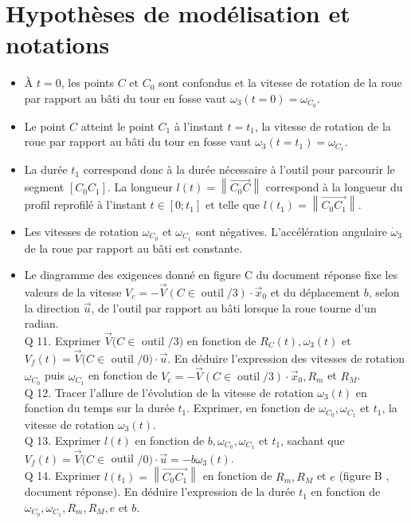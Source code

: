 \documentclass[10pt]{article}
\begin{document}
\section*{Hypothèses de modélisation et notations}
\begin{itemize}
  \item À $t=0$, les points $C$ et $C_{0}$ sont confondus et la vitesse de rotation de la roue par rapport au bâti du tour en fosse vaut $\omega_{3}(t=0)=\omega_{C_{0}}$.
  \item Le point $C$ atteint le point $C_{1}$ à l'instant $t=t_{1}$, la vitesse de rotation de la roue par rapport au bâti du tour en fosse vaut $\omega_{3}\left(t=t_{1}\right)=\omega_{C_{1}}$.
  \item La durée $t_{1}$ correspond donc à la durée nécessaire à l'outil pour parcourir le segment $\left[C_{0} C_{1}\right]$. La longueur $l(t)=\left\|\overrightarrow{C_{0} C}\right\|$ correspond à la longueur du profil reprofilé à l'instant $t \in\left[0 ; t_{1}\right]$ et telle que $l\left(t_{1}\right)=\left\|\overrightarrow{C_{0} C_{1}}\right\|$.
  \item Les vitesses de rotation $\omega_{C_{0}}$ et $\omega_{C_{1}}$ sont négatives. L'accélération angulaire $\dot{\omega}_{3}$ de la roue par rapport au bâti est constante.
  \item Le diagramme des exigences donné en figure C du document réponse fixe les valeurs de la vitesse $V_{c}= -\vec{V}(C \in \operatorname{outil} / 3) \cdot \vec{x}_{0}$ et du déplacement $b$, selon la direction $\vec{u}$, de l'outil par rapport au bâti lorsque la roue tourne d'un radian.\\
Q 11. Exprimer $\vec{V}(C \in$ outil $/ 3)$ en fonction de $R_{C}(t), \omega_{3}(t)$ et $V_{f}(t)=\vec{V}(C \in$ outil $/ 0) \cdot \vec{u}$. En déduire l'expression des vitesses de rotation $\omega_{C_{0}}$ puis $\omega_{C_{1}}$ en fonction de $V_{c}=-\vec{V}(C \in \operatorname{outil} / 3) \cdot \vec{x}_{0}, R_{m}$ et $R_{M}$.\\
Q 12. Tracer l'allure de l'évolution de la vitesse de rotation $\omega_{3}(t)$ en fonction du temps sur la durée $t_{1}$. Exprimer, en fonction de $\omega_{C_{0}}, \omega_{C_{1}}$ et $t_{1}$, la vitesse de rotation $\omega_{3}(t)$.\\
Q 13. Exprimer $l(t)$ en fonction de $b, \omega_{C_{0}}, \omega_{C_{1}}$ et $t_{1}$, sachant que $V_{f}(t)=\vec{V}(C \in$ outil $/ 0) \cdot \vec{u}=-b \omega_{3}(t)$.\\
Q 14. Exprimer $l\left(t_{1}\right)=\left\|\overrightarrow{C_{0} C_{1}}\right\|$ en fonction de $R_{m}, R_{M}$ et $e$ (figure B , document réponse). En déduire l'expression de la durée $t_{1}$ en fonction de $\omega_{C_{0}}, \omega_{C_{1}}, R_{m}, R_{M}, e$ et $b$.\\

\end{itemize}
\end{document}
